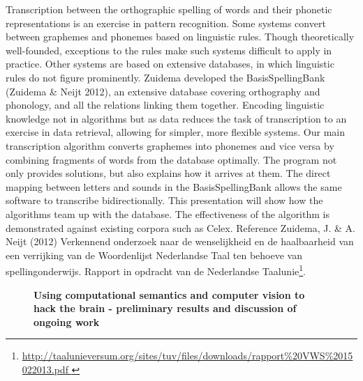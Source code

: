 \documentclass[10pt, a4paper, twopage, headinclude, footinclude, BCOR5mm]{scrartcl}
\begin{document}
{{\begin{table}[t!]
{\begin{tabular}{cc}
        
    \end{tabular} }
    \end{table}
        \begin{table}[t!]
    \end{table}

\noindent
Transcription between the orthographic spelling of words and their phonetic representations is an exercise in pattern recognition. Some systems convert between graphemes and phonemes based on linguistic rules. Though theoretically well-founded, exceptions to the rules make such systems difficult to apply in practice. Other systems are based on extensive databases, in which linguistic rules do not figure prominently.  Zuidema developed the BasisSpellingBank (Zuidema \& Neijt 2012), an extensive database covering orthography and phonology, and all the relations linking them together. Encoding linguistic knowledge not in algorithms but as data reduces the task of transcription to an exercise in data retrieval, allowing for simpler, more flexible systems.  Our main transcription algorithm converts graphemes into phonemes and vice versa by combining fragments of words from the database optimally. The program not only provides solutions, but also explains how it arrives at them. The direct mapping between letters and sounds in the BasisSpellingBank allows the same software to transcribe bidirectionally.  This presentation will show how the algorithms team up with the database. The effectiveness of the algorithm is demonstrated against existing corpora such as Celex.  Reference Zuidema, J. \& A. Neijt (2012) Verkennend onderzoek naar de wenselijkheid en de haalbaarheid van een verrijking van de Woordenlijst Nederlandse Taal ten behoeve van spellingonderwijs. Rapport in opdracht van de Nederlandse Taalunie\footnote{\url{ http://taalunieversum.org/sites/tuv/files/downloads/rapport\%20VWS\%2015022013.pdf }}.


\newpage

\begin{figure}[t!]
\centering
\large\textbf{Using computational semantics and computer vision to hack the brain - preliminary results and discussion of ongoing work}
\vspace*{0.5cm}
\end{figure}


}}
\end{document}

